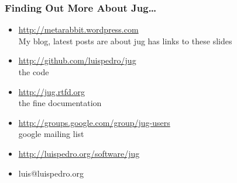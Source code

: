 \documentclass{beamer}
\begin{document}
\begin{frame}[fragile]
\frametitle{Finding Out More About Jug\ldots}
\begin{itemize}
\item \url{http://metarabbit.wordpress.com}\\My blog, latest posts are about jug \alert{has links to these slides}
\item \url{http://github.com/luispedro/jug}\\the code
\item \url{http://jug.rtfd.org}\\the fine documentation
\item \url{http://groups.google.com/group/jug-users}\\google mailing list
\item \url{http://luispedro.org/software/jug}
\item luis@luispedro.org
\end{itemize}

\end{frame}
\end{document}
